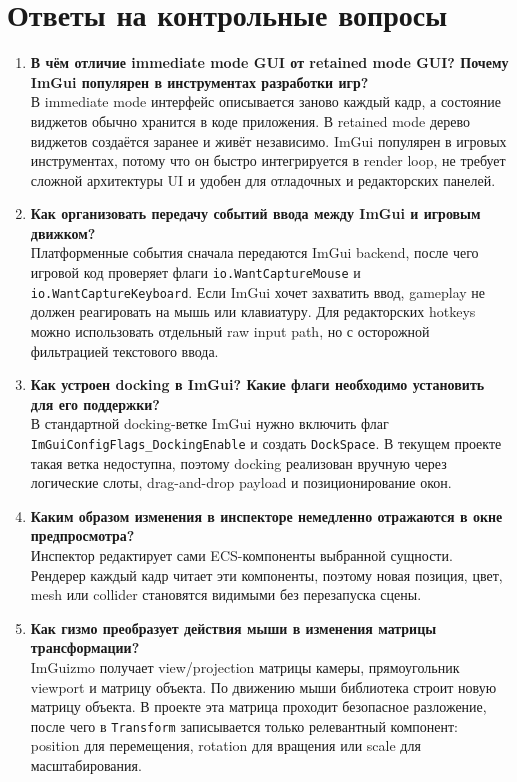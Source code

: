 \documentclass[a4paper,14pt]{extarticle}
\DeclareRobustCommand{\code}[1]{\nolinkurl{#1}}
\begin{document}
\section{Ответы на контрольные вопросы}
\begin{enumerate}
  \item \textbf{В чём отличие immediate mode GUI от retained mode GUI? Почему ImGui популярен в инструментах разработки игр?}\\
  В immediate mode интерфейс описывается заново каждый кадр, а состояние виджетов обычно хранится в коде приложения. В retained mode дерево виджетов создаётся заранее и живёт независимо. ImGui популярен в игровых инструментах, потому что он быстро интегрируется в render loop, не требует сложной архитектуры UI и удобен для отладочных и редакторских панелей.

  \item \textbf{Как организовать передачу событий ввода между ImGui и игровым движком?}\\
  Платформенные события сначала передаются ImGui backend, после чего игровой код проверяет флаги \texttt{io.WantCaptureMouse} и \texttt{io.WantCaptureKeyboard}. Если ImGui хочет захватить ввод, gameplay не должен реагировать на мышь или клавиатуру. Для редакторских hotkeys можно использовать отдельный raw input path, но с осторожной фильтрацией текстового ввода.

  \item \textbf{Как устроен docking в ImGui? Какие флаги необходимо установить для его поддержки?}\\
  В стандартной docking-ветке ImGui нужно включить флаг \code{ImGuiConfigFlags_DockingEnable} и создать \code{DockSpace}. В текущем проекте такая ветка недоступна, поэтому docking реализован вручную через логические слоты, drag-and-drop payload и позиционирование окон.

  \item \textbf{Каким образом изменения в инспекторе немедленно отражаются в окне предпросмотра?}\\
  Инспектор редактирует сами ECS-компоненты выбранной сущности. Рендерер каждый кадр читает эти компоненты, поэтому новая позиция, цвет, mesh или collider становятся видимыми без перезапуска сцены.

  \item \textbf{Как гизмо преобразует действия мыши в изменения матрицы трансформации?}\\
  ImGuizmo получает view/projection матрицы камеры, прямоугольник viewport и матрицу объекта. По движению мыши библиотека строит новую матрицу объекта. В проекте эта матрица проходит безопасное разложение, после чего в \texttt{Transform} записывается только релевантный компонент: position для перемещения, rotation для вращения или scale для масштабирования.


\end{enumerate}
\end{document}
